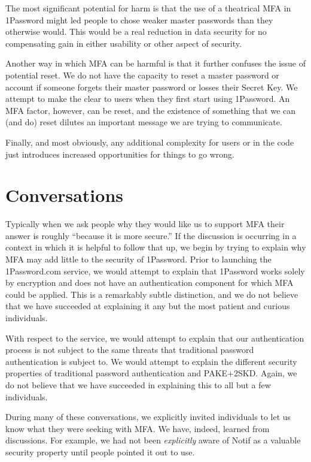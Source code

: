 \documentclass{soups}
\newcommand{\prop}[1]{\textsf{#1}}
\begin{document}
The most significant potential for harm is that the use of a theatrical MFA in 1Password might led people to chose weaker master passwords than they otherwise would. This would be a real reduction in data security for no compensating gain in either usability or other aspect of security.

Another way in which MFA can be harmful is that it further confuses the issue of potential reset. We do not have the capacity to reset a master password or account if someone forgets their master password or losses their Secret Key. We attempt to make the clear to users when they first start using 1Password. An MFA factor, however, can be reset, and the existence of something that we can (and do) reset dilutes an important message we are trying to communicate.

Finally, and most obviously, any additional complexity for users or in the code just introduces increased opportunities for things to go wrong.

\section{Conversations}

Typically when we ask people why they would like us to support MFA their answer is roughly “because it is more secure.” 
If the discussion is occurring in a context in which it is helpful to follow that up,
we begin by trying to explain why MFA may add little to the security of 1Password.
Prior to launching the 1Password.com service, we would attempt to explain that
1Password works solely by encryption and does not have an authentication component for which MFA could be applied.
This is a remarkably subtle distinction,
and we do not believe that we have succeeded at explaining it any but the
most patient and curious individuals.

With respect to the service, we would attempt to explain that our authentication process is not subject to the same threats that traditional password authentication is subject to.
We would attempt to explain the different security properties of traditional password authentication and PAKE+2SKD.
Again, we do not believe that we have succeeded in explaining this to all but
a few individuals.

During many of these conversations,
we explicitly invited individuals to let us know what they were seeking with MFA\@.
We have, indeed, learned from discussions.
For example, we had not been \emph{explicitly} aware of \prop{Notif} as a valuable security property until people pointed it out to use.
\end{document}
